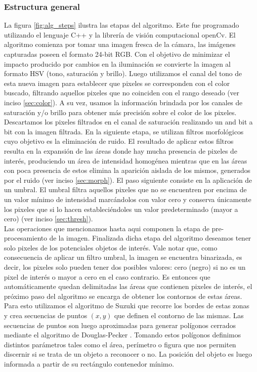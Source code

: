 \subsubsection{Estructura general}
La figura \ref{fig:alg_steps} ilustra las etapas del algoritmo. Este fue programado utilizando el lenguaje C++ y la librería de visión computacional openCv.
El algoritmo comienza por tomar una imagen fresca de la cámara, las 
imágenes capturadas poseen el formato 24-bit RGB. Con el objetivo de 
minimizar el impacto producido por cambios en la iluminación se 
convierte la imagen al formato HSV (tono, saturación y brillo). Luego 
utilizamos el canal del tono de esta nueva imagen para establecer que 
pixeles se corresponden con el color buscado, filtrando aquellos 
pixeles que no coinciden con el rango deseado (ver inciso 
\ref{sec:color}). A su vez, usamos la información brindada por los  canales de saturación y/o brillo para obtener más precisión sobre el color de los pixeles.\\
	\indent Descartamos los pixeles filtrados en el canal de saturación 
	realizando un and bit a bit con la imagen filtrada.  En la siguiente 
	etapa, se utilizan filtros morfológicos cuyo objetivo es la 
	eliminación de ruido. El resultado de aplicar estos filtros resulta 
	en la expansión de las áreas donde hay mucha presencia de pixeles de 
	interés, produciendo un área de intensidad homogénea mientras que 
	en las áreas con poca presencia de estos 
	elimina la aparición aislada de los mismos, generados por el ruido (ver 
	inciso \ref{sec:morph}). El paso 
	siguiente consiste en la aplicación de un umbral. El umbral filtra 
	aquellos pixeles que no se encuentren por encima de un valor mínimo 
	de intensidad marcándolos con valor cero y conserva únicamente los 
	pixeles que si lo hacen estableciéndoles un valor predeterminado 
	(mayor a cero) (ver inciso \ref{sec:thresh}). \\
	\indent Las operaciones que mencionamos hasta aqui componen la 
	etapa de  pre-procesamiento de la imagen. Finalizada dicha etapa del 
	algoritmo deseamos tener solo pixeles de los potenciales objetos de 
	interés. Vale notar que, como consecuencia de aplicar un filtro 
	umbral, la imagen se encuentra binarizada, es decir, los pixeles solo 
	pueden tener dos posibles valores: cero (negro) si no es un pixel de 
	interés o mayor a cero en el caso contrario. Es entonces que 
	automáticamente quedan delimitadas las áreas que contienen pixeles 
	de interés, el próximo paso del algoritmo se encarga de obtener los 
	contornos de estas áreas. Para esto utilizamos el algoritmo de Suzuki 
	\cite{suzuki85} que recorre los bordes de estas zonas y crea 
	secuencias de puntos $(x,y)$ que definen el contorno de las mismas. 
	Las secuencias de puntos son luego aproximadas para generar polígonos 
	cerrados mediante el algoritmo de Douglas-Pecker \cite{dp74}. Tomando 
	estos polígonos definimos distintos parámetros tales como el área, 
	perímetro o figura que nos permiten discernir si se trata de un objeto 
	a reconocer o no. La posición del objeto es luego informada a 
	partir de su rectángulo contenedor mínimo.


